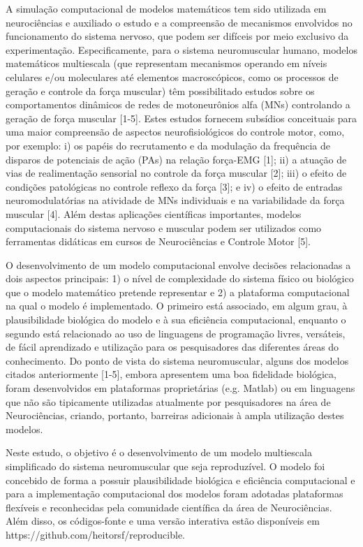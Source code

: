 A simulação computacional de modelos matemáticos tem sido utilizada em neurociências e auxiliado o estudo e a compreensão de mecanismos envolvidos no funcionamento do sistema nervoso, que podem ser difíceis por meio exclusivo da experimentação. Especificamente, para o sistema neuromuscular humano, modelos matemáticos multiescala (que representam mecanismos operando em níveis celulares e/ou moleculares até elementos macroscópicos, como os processos de geração e controle da força muscular) têm possibilitado estudos sobre os comportamentos dinâmicos de redes de motoneurônios alfa (MNs) controlando a geração de força muscular [1-5]. Estes estudos fornecem subsídios conceituais para uma maior compreensão de aspectos neurofisiológicos do controle motor, como, por exemplo: i) os papéis do recrutamento e da modulação da frequência de disparos de potenciais de ação (PAs) na relação força-EMG [1]; ii) a atuação de vias de realimentação sensorial no controle da força muscular [2]; iii) o efeito de condições patológicas no controle reflexo da força [3]; e iv) o efeito de entradas neuromodulatórias na atividade de MNs individuais e na variabilidade da força muscular [4]. Além destas aplicações científicas importantes, modelos computacionais do sistema nervoso e muscular podem ser utilizados como ferramentas didáticas em cursos de Neurociências e Controle Motor [5].

O desenvolvimento de um modelo computacional envolve decisões relacionadas a dois aspectos principais: 1) o nível de complexidade do sistema físico ou biológico que o modelo matemático pretende representar e 2) a plataforma computacional na qual o modelo é implementado. O primeiro está associado, em algum grau, à plausibilidade biológica do modelo e à sua eficiência computacional, enquanto o segundo está relacionado ao uso de linguagens de programação livres, versáteis, de fácil aprendizado e utilização para os pesquisadores das diferentes áreas do conhecimento. Do ponto de vista do sistema neuromuscular, alguns dos modelos citados anteriormente [1-5], embora apresentem uma boa fidelidade biológica, foram desenvolvidos em plataformas proprietárias (e.g. Matlab) ou em linguagens que não são tipicamente utilizadas atualmente por pesquisadores na área de Neurociências, criando, portanto, barreiras adicionais à ampla utilização destes modelos.

Neste estudo, o objetivo é o desenvolvimento de um modelo multiescala simplificado do sistema neuromuscular que seja reproduzível. O modelo foi concebido de forma a possuir plausibilidade biológica e eficiência computacional e para a implementação computacional dos modelos foram adotadas plataformas flexíveis e reconhecidas pela comunidade científica da área de Neurociências. Além disso, os códigos-fonte e uma versão interativa estão disponíveis em https://github.com/heitorsf/reproducible.